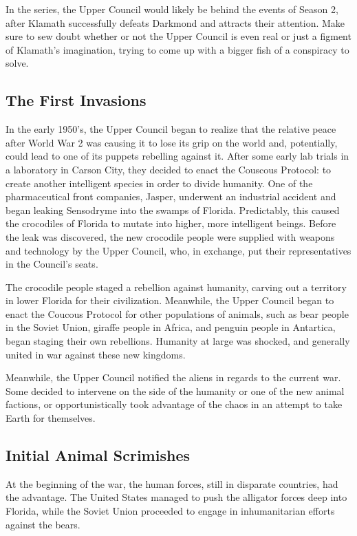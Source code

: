 \documentclass{article}
\begin{document}
In the series, the Upper Council would likely be behind the events of Season 2, after Klamath successfully defeats Darkmond and attracts their attention. Make sure to sew doubt whether or not the Upper Council is even real or just a figment of Klamath's imagination, trying to come up with a bigger fish of a conspiracy to solve.

\subsection{The First Invasions}

In the early 1950's, the Upper Council began to realize that the relative peace after World War 2 was causing it to lose its grip on the world and, potentially, could lead to one of its puppets rebelling against it. After some early lab trials in a laboratory in Carson City, they decided to enact the Couscous Protocol: to create another intelligent species in order to divide humanity. One of the pharmaceutical front companies, Jasper, underwent an industrial accident and began leaking Sensodryme into the swamps of Florida. Predictably, this caused the crocodiles of Florida to mutate into higher, more intelligent beings. Before the leak was discovered, the new crocodile people were supplied with weapons and technology by the Upper Council, who, in exchange, put their representatives in the Council's seats.

The crocodile people staged a rebellion against humanity, carving out a territory in lower Florida for their civilization. Meanwhile, the Upper Council began to enact the Coucous Protocol for other populations of animals, such as bear people in the Soviet Union, giraffe people in Africa, and penguin people in Antartica, began staging their own rebellions. Humanity at large was shocked, and generally united in war against these new kingdoms.

Meanwhile, the Upper Council notified the aliens in regards to the current war. Some decided to intervene on the side of the humanity or one of the new animal factions, or opportunistically took advantage of the chaos in an attempt to take Earth for themselves.

\subsection{Initial Animal Scrimishes}

At the beginning of the war, the human forces, still in disparate countries, had the advantage. The United States managed to push the alligator forces deep into Florida, while the Soviet Union proceeded to engage in inhumanitarian efforts against the bears.
\end{document}
